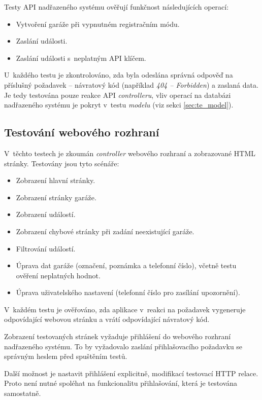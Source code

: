 Testy API nadřazeného systému ověřují funkčnost následujících operací:

\begin{itemize}
    \item Vytvoření garáže při vypnutném registračním módu.
    \item Zaslání události.
    \item Zaslání události s~neplatným API klíčem.
\end{itemize}

U~každého testu je zkontrolováno, zda byla odeslána správná odpověď na příslušný požadavek -- návratový kód (například \textit{404 -- Forbidden}) a zaslaná data. Je tedy testována pouze reakce API \textit{controlleru}, vliv operací na databázi nadřazeného systému je pokryt v~testu \textit{modelu} (viz sekci \ref{sec:te_model}).

\subsection{Testování webového rozhraní}

V~těchto testech je zkoumán \textit{controller} webového rozhraní a zobrazované HTML stránky. Testovány jsou tyto scénáře:

\begin{itemize}
    \item Zobrazení hlavní stránky.
    \item Zobrazení stránky garáže.
    \item Zobrazení událostí.
    \item Zobrazení chybové stránky při zadání neexistující garáže.
    \item Filtrování událostí.
    \item Úprava dat garáže (označení, poznámka a telefonní číslo), včetně testu ověření neplatných hodnot.
    \item Úprava uživatelského nastavení (telefonní číslo pro zasílání upozornění).
\end{itemize}

V~každém testu je ověřováno, zda aplikace v~reakci na požadavek vygeneruje odpovídající webovou stránku a vrátí odpovídající návratový kód.

Zobrazení testovaných stránek vyžaduje přihlášení do webového rozhraní nadřazeného systému. To by vyžadovalo zaslání přihlašovacího požadavku se správným heslem před spuštěním testů.

Další možnost je nastavit přihlášení explicitně, modifikací testovací HTTP relace. Proto není nutné spoléhat na funkcionalitu přihlašování, která je testována samostatně.

